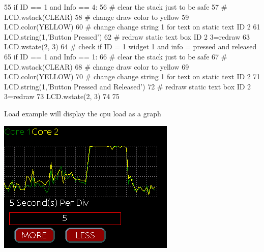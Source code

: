 \begin{DoxyCodeInclude}
55     \textcolor{keywordflow}{if} ID == 1 \textcolor{keywordflow}{and} Info == 4:
56         \textcolor{comment}{# clear the stack just to be safe}
57 \textcolor{comment}{#       LCD.wstack(CLEAR)}
58         \textcolor{comment}{# change draw color to yellow}
59         LCD.color(YELLOW)
60         \textcolor{comment}{# change change string 1 for text on static text ID 2}
61         LCD.string(1,\textcolor{stringliteral}{'Button Pressed'})
62         \textcolor{comment}{# redraw static text box ID 2 3=redraw      }
63         LCD.wstate(2, 3)
64     \textcolor{comment}{# check if ID = 1 widget 1 and info = pressed and released}
65     \textcolor{keywordflow}{if} ID == 1 \textcolor{keywordflow}{and} Info == 1:
66         \textcolor{comment}{# clear the stack just to be safe}
67 \textcolor{comment}{#       LCD.wstack(CLEAR)}
68         \textcolor{comment}{# change draw color to yellow}
69         LCD.color(YELLOW)
70         \textcolor{comment}{# change change string 1 for text on static text ID 2}
71         LCD.string(1,\textcolor{stringliteral}{'Button Pressed and Released'})
72         \textcolor{comment}{# redraw static text box ID 2 3=redraw}
73         LCD.wstate(2, 3)
74 
75         
\end{DoxyCodeInclude}
 Load example will display the cpu load as a graph \par
  
\begin{DoxyImageNoCaption}
  \mbox{\includegraphics{load.png}}
\end{DoxyImageNoCaption}
 
